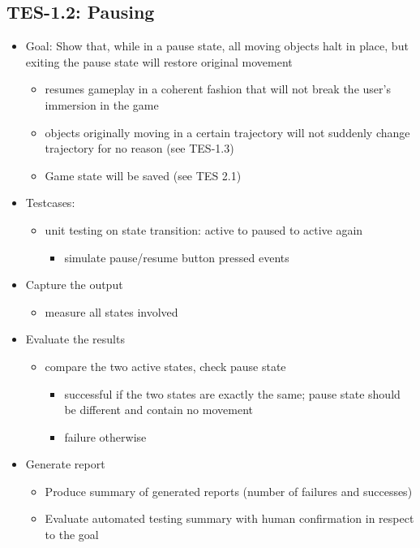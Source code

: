 \subsection{TES-1.2: Pausing}
\begin{itemize}
\item Goal: Show that, while in a pause state, all moving objects halt in place, but exiting the pause state will restore original movement
\begin{itemize}
\item resumes gameplay in a coherent fashion that will not break the user\textquoteright{}s immersion in the game
\item objects originally moving in a certain trajectory will not suddenly change trajectory for no reason (see TES-1.3)
\item Game state will be saved (see TES 2.1)
\end{itemize}

\item Testcases:
\begin{itemize}
\item unit testing on state transition: active to paused to active again
\begin{itemize}
\item simulate pause/resume button pressed events
\end{itemize}
\end{itemize}

\item Capture the output
\begin{itemize}
\item measure all states involved
\end{itemize}

\item Evaluate the results
\begin{itemize}
\item compare the two active states, check pause state
\begin{itemize}
\item successful if the two states are exactly the same; pause state should be different and contain no movement
\item failure otherwise
\end{itemize}
\end{itemize}

\item Generate report
\begin{itemize}
\item Produce summary of generated reports (number of failures and successes)
\item Evaluate automated testing summary with human confirmation in respect to the goal
\end{itemize}
\end{itemize}

